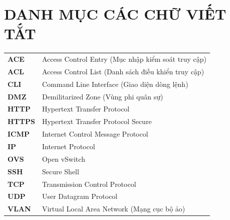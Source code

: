 \section*{DANH MỤC CÁC CHỮ VIẾT TẮT}
 {}

\begin{longtable}{l p{12cm}}
    \textbf{ACE} & Access Control Entry (Mục nhập kiểm soát truy cập) \\
    \textbf{ACL} & Access Control List (Danh sách điều khiển truy cập) \\
    \textbf{CLI} & Command Line Interface (Giao diện dòng lệnh) \\
    \textbf{DMZ} & Demilitarized Zone (Vùng phi quân sự) \\
    \textbf{HTTP} & Hypertext Transfer Protocol \\
    \textbf{HTTPS} & Hypertext Transfer Protocol Secure \\
    \textbf{ICMP} & Internet Control Message Protocol \\
    \textbf{IP} & Internet Protocol \\
    \textbf{OVS} & Open vSwitch \\
    \textbf{SSH} & Secure Shell \\
    \textbf{TCP} & Transmission Control Protocol \\
    \textbf{UDP} & User Datagram Protocol \\
    \textbf{VLAN} & Virtual Local Area Network (Mạng cục bộ ảo) \\
\end{longtable}

\newpage
